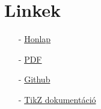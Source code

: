 \chapter{Linkek}

\begin{enumerate}
    \item[-] \href{https://a-gondolkodas-orome.github.io/latex-tutorial/index.html}{Honlap}
    \item[-] \href{https://a-gondolkodas-orome.github.io/latex-tutorial/mainpage.pdf}{PDF}
    \item[-] \href{https://github.com/a-gondolkodas-orome/latex-tutorial}{Github} 
    \item[-] \href{https://ctan.ijs.si/tex-archive/graphics/pgf/base/doc/pgfmanual.pdf}{TikZ dokumentáció} 
\end{enumerate}
        
